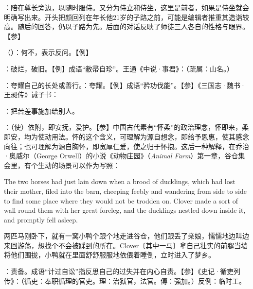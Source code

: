 {
\item {}：陪在尊长旁边，以随时服侍。又分为侍立和侍坐，这里是前者，如果是侍坐就会明确写出来。开头把颜回列在年长他21岁的子路之前，可能是编辑者推重其造诣较高。随后的回答，仍以子路为先。后面的对话反映了师徒三人各自的性格与眼界。【参】
\item {}（）：何不，表示反问。【例】 
\item {}：破烂，破旧。【例】成语“敝帚自珍”。王通《中说·事君》：（疏属：山名。）
\item {}：夸耀自己的长处或善行。：夸耀。【例】成语“矜功伐能”。【参】《三国志·魏书·王昶传》诫子书：
\item {}：把苦差事施加给别人。
\item {}：（使）依附，即安抚，爱护。【参】中国古代素有“怀柔”的政治理念，怀即来，柔即安，均为使动用法。怀的这个含义，可理解为源自想念，即给予恩惠，使其感念向往；也可理解为源自胸怀，即宽厚仁爱，使之归于怀抱。这后一种解释，在乔治·奥威尔（George Orwell）的小说《动物庄园》（\emph{Animal Farm}）第一章，谷仓集会里，有个生动的场景可以作为写照：
\begin{lyquotepara}
The two horses had just lain down when a brood of ducklings, which had lost their mother, filed into the barn, cheeping feebly and wandering from side to side to find some place where they would not be trodden on. Clover made a sort of wall round them with her great foreleg, and the ducklings nestled down inside it, and promptly fell asleep.

两匹马刚卧下，就有一窝小鸭个跟个地走进谷仓，他们跟丢了亲娘，懦懦地边叫边来回游荡，想找个不会被踩到的所在。Clover〔其中一马〕拿自己壮实的前腿当墙将他们围拢，小鸭就在里面舒舒服服地依偎着睡倒，立时进入了梦乡。
\end{lyquotepara}
}
{}


{
\item {}：责备。成语“计过自讼”指反思自己的过失并在内心自责。【参】《史记·循吏列传》：（循吏：奉职循理的官吏。理：治狱官，法官。傅：强加。）反例：临时工。
}
{}


